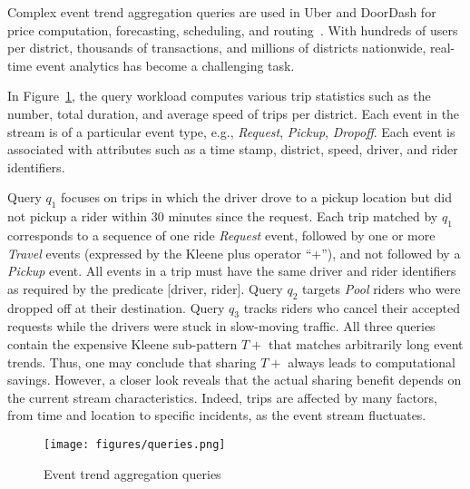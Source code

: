 \begin{example}
Complex event trend aggregation queries are  used in Uber and DoorDash for price computation, forecasting, scheduling, and routing~\cite{uber-athenax}. With hundreds of users per district, thousands of transactions, and millions of districts nationwide, real-time event analytics has become a challenging task.

In Figure~\ref{fig:queries}, the query workload  computes various trip statistics such as the number, total duration, and average speed of trips per district. Each event in the stream is of a particular event type, e.g., \textit{Request}, \textit{Pickup}, \textit{Dropoff}. Each event is associated with attributes such as a time stamp, district, speed, driver, and rider identifiers.

%
Query $q_1$ focuses on trips in which the driver drove to a pickup location but did not pickup a rider within 30 minutes since the request. Each trip matched by $q_1$ corresponds to a sequence of one ride \textit{Request} event, followed by one or more \textit{Travel} events (expressed by the Kleene plus operator ``+''), and not followed by a \textit{Pickup} event. All events in a trip must have the same driver and rider identifiers as required by the predicate [driver, rider].
%
Query $q_2$ targets \textit{Pool} riders who were dropped off at their destination. 
Query $q_3$ tracks riders who cancel their accepted requests while the drivers were stuck in slow-moving traffic.
%
All three queries contain the expensive Kleene sub-pattern $T+$ that matches arbitrarily long event trends. Thus, one may conclude that sharing $T+$ always leads to computational savings. However, a closer look reveals that the actual sharing benefit depends on the current stream characteristics. Indeed, trips are affected by many factors, from time and location to specific incidents, as the event stream fluctuates. 
%
%
%
\label{ex:motivating}
\end{example}

\vspace*{-2mm}
\begin{figure}[!htb]
\centering
\texttt{[image: figures/queries.png]}
\caption{Event trend aggregation queries}
\label{fig:queries}
\end{figure}
\vspace*{-2mm}

